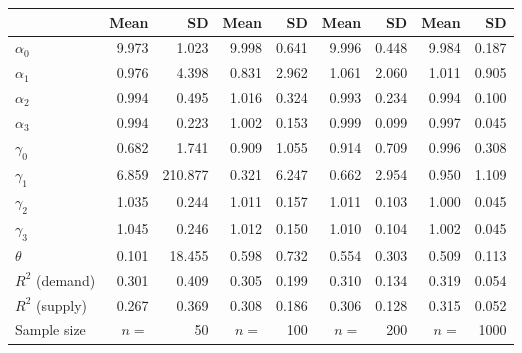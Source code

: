 
\begin{tabular}[t]{lrrrrrrrr}
\toprule
  & Mean & SD & Mean  & SD  & Mean   & SD   & Mean    & SD   \\
\midrule
$\alpha_{0}$ & 9.973 & 1.023 & 9.998 & 0.641 & 9.996 & 0.448 & 9.984 & 0.187\\
$\alpha_{1}$ & 0.976 & 4.398 & 0.831 & 2.962 & 1.061 & 2.060 & 1.011 & 0.905\\
$\alpha_{2}$ & 0.994 & 0.495 & 1.016 & 0.324 & 0.993 & 0.234 & 0.994 & 0.100\\
$\alpha_{3}$ & 0.994 & 0.223 & 1.002 & 0.153 & 0.999 & 0.099 & 0.997 & 0.045\\
$\gamma_{0}$ & 0.682 & 1.741 & 0.909 & 1.055 & 0.914 & 0.709 & 0.996 & 0.308\\
$\gamma_{1}$ & 6.859 & 210.877 & 0.321 & 6.247 & 0.662 & 2.954 & 0.950 & 1.109\\
$\gamma_{2}$ & 1.035 & 0.244 & 1.011 & 0.157 & 1.011 & 0.103 & 1.000 & 0.045\\
$\gamma_{3}$ & 1.045 & 0.246 & 1.012 & 0.150 & 1.010 & 0.104 & 1.002 & 0.045\\
$\theta$ & 0.101 & 18.455 & 0.598 & 0.732 & 0.554 & 0.303 & 0.509 & 0.113\\
$R^{2}$ (demand) & 0.301 & 0.409 & 0.305 & 0.199 & 0.310 & 0.134 & 0.319 & 0.054\\
$R^{2}$ (supply) & 0.267 & 0.369 & 0.308 & 0.186 & 0.306 & 0.128 & 0.315 & 0.052\\
Sample size & $n =$ & 50 & $n =$ & 100 & $n =$ & 200 & $n =$ & 1000\\
\bottomrule
\end{tabular}
